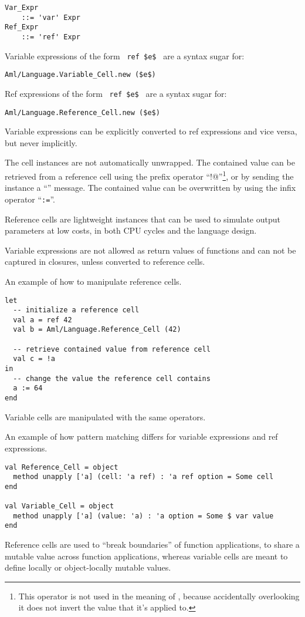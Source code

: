 \grammar\begin{lstlisting}
Var_Expr
    ::= 'var' Expr
Ref_Expr 
    ::= 'ref' Expr
\end{lstlisting}

Variable expressions of the form ~\lstinline!ref $e$!~ are a syntax sugar for:
\begin{lstlisting}[deletekeywords={new}]
Aml/Language.Variable_Cell.new ($e$)
\end{lstlisting}

Ref expressions of the form ~\lstinline!ref $e$!~ are a syntax sugar for:
\begin{lstlisting}[deletekeywords={new}]
Aml/Language.Reference_Cell.new ($e$)
\end{lstlisting}

Variable expressions can be explicitly converted to ref expressions and vice versa, but never implicitly. 

The cell instances are not automatically unwrapped. The contained value can be retrieved from a reference cell using the prefix operator ``\lstinline@!@''\footnote{This operator is not used in the meaning of , because accidentally overlooking it does not invert the value that it's applied to.}, or by sending the instance a ``'' message. The contained value can be overwritten by using the infix operator ``\lstinline!:=!''.

Reference cells are lightweight instances that can be used to simulate output parameters at low costs, in both CPU cycles and the language design.

Variable expressions are not allowed as return values of functions and can not be captured in closures, unless converted to reference cells. 

\example An example of how to manipulate reference cells. 
\begin{lstlisting}
let 
  -- initialize a reference cell
  val a = ref 42
  val b = Aml/Language.Reference_Cell (42)

  -- retrieve contained value from reference cell
  val c = !a
in
  -- change the value the reference cell contains
  a := 64
end
\end{lstlisting}
Variable cells are manipulated with the same operators. 

\example An example of how pattern matching differs for variable expressions and ref expressions. 
\begin{lstlisting}[mathescape=false]
val Reference_Cell = object 
  method unapply ['a] (cell: 'a ref) : 'a ref option = Some cell
end

val Variable_Cell = object
  method unapply ['a] (value: 'a) : 'a option = Some $ var value
end
\end{lstlisting}
Reference cells are used to ``break boundaries'' of function applications, to share a mutable value across function applications, whereas variable cells are meant to define locally or object-locally mutable values.





